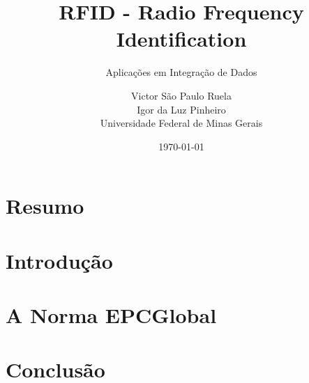 \documentclass[a4paper,12pt,titlepage]{scrartcl}
\begin{document}
\title{RFID - Radio Frequency Identification}
\subtitle{Aplicações em Integração de Dados}
\author{Victor São Paulo Ruela \\ Igor da Luz Pinheiro \\ Universidade Federal de Minas Gerais}
\date{\today}

\maketitle

\tableofcontents
\newpage 
\listoffigures
\newpage
\listoftables
\newpage


\section{Resumo}
\section{Introdução}

\section{A Norma EPCGlobal}

\section{Conclusão}


\newpage

\nocite{*}

\end{document}
